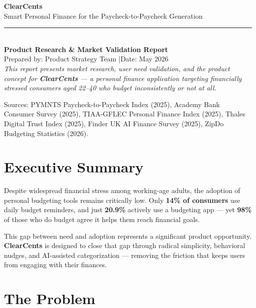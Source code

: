 \documentclass[11pt,a4paper]{article}
\begin{document}
\thispagestyle{empty}
\vspace*{4cm}
\begin{center}
  {\Huge\bfseries\color{navyblue} ClearCents}\\[0.5em]
  {\large\color{accentblue} Smart Personal Finance for the Paycheck-to-Paycheck Generation}\\[1em]
  {\color{accentblue}\rule{12cm}{1pt}}\\[1em]
  {\normalsize\textbf{Product Research \& Market Validation Report}}\\[0.4em]
  {\normalsize Prepared by: Product Strategy Team \quad|\quad Date: May 2026}\\[2em]
  {\small\itshape This report presents market research, user need validation, and the product
  concept for \textbf{ClearCents} --- a personal finance application targeting financially
  stressed consumers aged 22--40 who budget inconsistently or not at all.}
\end{center}
\vfill
{\footnotesize\color{gray}
Sources: PYMNTS Paycheck-to-Paycheck Index (2025), Academy Bank Consumer Survey (2025),
TIAA-GFLEC Personal Finance Index (2025), Thales Digital Trust Index (2025),
Finder UK AI Finance Survey (2025), ZipDo Budgeting Statistics (2026).}
\newpage

\section{Executive Summary}

Despite widespread financial stress among working-age adults, the adoption of personal
budgeting tools remains critically low. Only \textbf{14\% of consumers} use daily budget
reminders, and just \textbf{20.9\%} actively use a budgeting app --- yet \textbf{98\%} of
those who do budget agree it helps them reach financial goals.

This gap between need and adoption represents a significant product opportunity.
\textbf{ClearCents} is designed to close that gap through radical simplicity, behavioral
nudges, and AI-assisted categorization --- removing the friction that keeps users from
engaging with their finances.

\section{The Problem}
\end{document}
